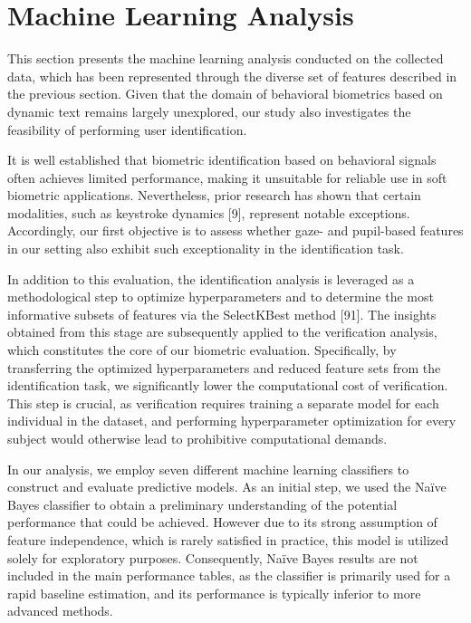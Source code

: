 \documentclass{article}
\begin{document}
\newpage

\section{Machine Learning Analysis}

This section presents the machine learning analysis conducted on the collected data, which has been represented through the diverse set of features described in the previous section. 
Given that the domain of behavioral biometrics based on dynamic text remains largely unexplored, our study also investigates the feasibility of performing user identification. 

It is well established that biometric identification based on behavioral signals often achieves limited performance, making it unsuitable for reliable use in soft biometric applications. 
Nevertheless, prior research has shown that certain modalities, such as keystroke dynamics [9], represent notable exceptions. 
Accordingly, our first objective is to assess whether gaze- and pupil-based features in our setting also exhibit such exceptionality in the identification task. 

In addition to this evaluation, the identification analysis is leveraged as a methodological step to optimize hyperparameters and to determine the most informative subsets of features via the SelectKBest method [91]. 
The insights obtained from this stage are subsequently applied to the verification analysis, which constitutes the core of our biometric evaluation. 
Specifically, by transferring the optimized hyperparameters and reduced feature sets from the identification task, we significantly lower the computational cost of verification. 
This step is crucial, as verification requires training a separate model for each individual in the dataset, and performing hyperparameter optimization for every subject would otherwise lead to prohibitive computational demands.

In our analysis, we employ seven different machine learning classifiers to construct and evaluate predictive models.
As an initial step, we used the Naïve Bayes classifier to obtain a preliminary understanding of the potential performance that could be achieved.
However due to its strong assumption of feature independence, which is rarely satisfied in practice, this model is utilized solely for exploratory purposes.
Consequently, Naïve Bayes results are not included in the main performance tables, as the classifier is primarily used for a rapid baseline estimation, and its performance is typically inferior to more advanced methods.
\end{document}
